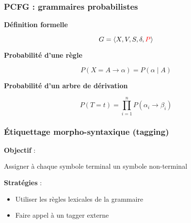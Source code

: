 \documentclass{beamer}
\begin{document}
\begin{frame}
\frametitle{PCFG : grammaires probabilistes}
\pause
\textbf{D\'efinition formelle}

$$G = \left< X, V, S, \delta, \textcolor{red}{P} \right>$$

\pause
\textbf{Probabilit\'e d'une r\`egle}

$$P(X = A \rightarrow \alpha) = P(\alpha \mid A)$$

\pause
\textbf{Probabilit\'e d'un arbre de d\'erivation}

$$P(T = t) = \prod_{i=1}^{n} P(\alpha_i \rightarrow \beta_i)$$

\end{frame}

\begin{frame}
\frametitle{\'Etiquettage morpho-syntaxique (tagging)}
\pause
\textbf{Objectif} :

\begin{center}Assigner \`a chaque symbole terminal un symbole non-terminal\end{center}

\vspace{1cm}

\pause
\textbf{Strat\'egies} :
\begin{itemize}
\pause
\item Utiliser les r\`egles lexicales de la grammaire
\pause
\item Faire appel \`a un tagger externe
\end{itemize}
\end{frame}
\end{document}
